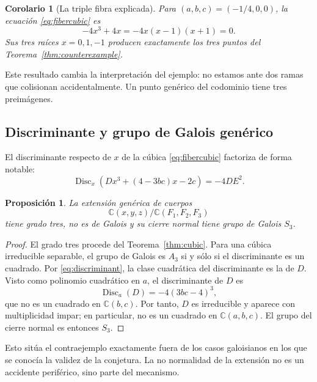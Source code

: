 \documentclass[11pt]{article}
\newtheorem{proposition}[theorem]{Proposici\'on}
\newtheorem{corollary}[theorem]{Corolario}
\theoremstyle{definition}
\theoremstyle{remark}
\newcommand{\C}{\mathbb{C}}
\begin{document}
\begin{corollary}[La triple fibra explicada]
Para $(a,b,c)=(-1/4,0,0)$, la ecuaci\'on \eqref{eq:fibercubic} es
\[
-4x^3+4x=-4x(x-1)(x+1)=0.
\]
Sus tres ra\'ices $x=0,1,-1$ producen exactamente los tres puntos del
Teorema~\ref{thm:counterexample}.
\end{corollary}

Este resultado cambia la interpretaci\'on del ejemplo: no estamos ante dos
ramas que colisionan accidentalmente. Un punto gen\'erico del codominio tiene
tres preim\'agenes.

\subsection{Discriminante y grupo de Galois gen\'erico}

El discriminante respecto de $x$ de la c\'ubica \eqref{eq:fibercubic}
factoriza de forma notable:
\begin{equation}\label{eq:discriminant}
\operatorname{Disc}_x
\left(Dx^3+(4-3bc)x-2c\right)
=-4D E^2.
\end{equation}

\begin{proposition}\label{prop:S3}
La extensi\'on gen\'erica de cuerpos
\[
\C(x,y,z)/\C(F_1,F_2,F_3)
\]
tiene grado tres, no es de Galois y su cierre normal tiene grupo de Galois
$S_3$.
\end{proposition}

\begin{proof}
El grado tres procede del Teorema~\ref{thm:cubic}. Para una c\'ubica irreducible
separable, el grupo de Galois es $A_3$ si y s\'olo si el discriminante es un
cuadrado. Por \eqref{eq:discriminant}, la clase cuadr\'atica del discriminante
es la de $D$. Visto como polinomio cuadr\'atico en $a$, el discriminante de $D$
es
\[
\operatorname{Disc}_a(D)=-4(3bc-4)^3,
\]
que no es un cuadrado en $\C(b,c)$. Por tanto, $D$ es irreducible y aparece con
multiplicidad impar; en particular, no es un cuadrado en $\C(a,b,c)$. El grupo
del cierre normal es entonces $S_3$.
\end{proof}

Esto sit\'ua el contraejemplo exactamente fuera de los casos galoisianos en los
que se conoc\'ia la validez de la conjetura. La no normalidad de la extensi\'on
no es un accidente perif\'erico, sino parte del mecanismo.
\end{document}
